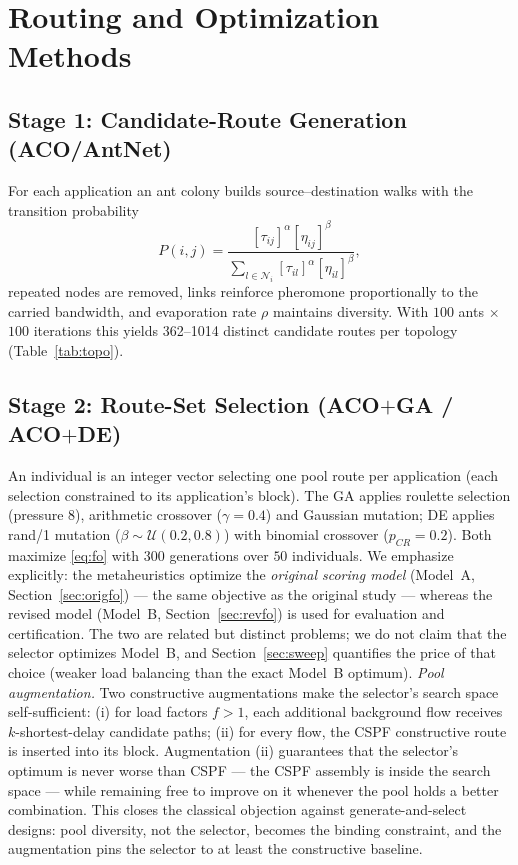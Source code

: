 \documentclass[journal]{IEEEtran}
\begin{document}
\section{Routing and Optimization Methods}
\label{sec:method}

\subsection{Stage 1: Candidate-Route Generation (ACO/AntNet)}
For each application an ant colony builds source--destination walks with the
transition probability
\begin{equation}
P(i,j)=\frac{[\tau_{ij}]^{\alpha}[\eta_{ij}]^{\beta}}
{\sum_{l\in\mathcal{N}_i}[\tau_{il}]^{\alpha}[\eta_{il}]^{\beta}},
\label{eq:aco}
\end{equation}
repeated nodes are removed, links reinforce pheromone proportionally to the
carried bandwidth, and evaporation rate $\rho$ maintains diversity. With
$100$ ants $\times$ $100$ iterations this yields 362--1014 distinct candidate
routes per topology (Table~\ref{tab:topo}).

\subsection{Stage 2: Route-Set Selection (ACO$+$GA / ACO$+$DE)}
An individual is an integer vector selecting one pool route per application
(each selection constrained to its application's block). The GA applies
roulette selection (pressure 8), arithmetic crossover ($\gamma{=}0.4$) and
Gaussian mutation; DE applies rand/1 mutation
($\beta\sim\mathcal{U}(0.2,0.8)$) with binomial crossover ($p_{CR}{=}0.2$).
Both maximize \eqref{eq:fo} with $300$ generations over $50$ individuals.
We emphasize explicitly: the metaheuristics optimize the \emph{original
scoring model} (Model~A, Section~\ref{sec:origfo}) --- the same objective as
the original study --- whereas the revised model (Model~B,
Section~\ref{sec:revfo}) is used for evaluation and certification. The two
are related but distinct problems; we do not claim that the selector
optimizes Model~B, and Section~\ref{sec:sweep} quantifies the price of that
choice (weaker load balancing than the exact Model~B optimum).
\emph{Pool augmentation.} Two constructive augmentations make the selector's
search space self-sufficient: (i) for load factors $f>1$, each additional
background flow receives $k$-shortest-delay candidate paths; (ii) for every
flow, the CSPF constructive route is inserted into its block. Augmentation
(ii) guarantees that the selector's optimum is never worse than CSPF --- the
CSPF assembly is inside the search space --- while remaining free to improve
on it whenever the pool holds a better combination. This closes the
classical objection against generate-and-select designs: pool diversity, not
the selector, becomes the binding constraint, and the augmentation pins the
selector to at least the constructive baseline.
\end{document}
